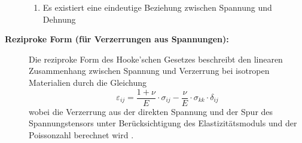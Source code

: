 \begin{description}
\begin{enumerate}
	 	\item Es existiert eine eindeutige Beziehung zwischen Spannung und Dehnung
	 \end{enumerate}
	 \item[\textbf{Reziproke Form (für Verzerrungen aus Spannungen):}] Die reziproke Form des Hooke’schen Gesetzes beschreibt den linearen Zusammenhang zwischen Spannung und Verzerrung bei isotropen Materialien durch die Gleichung
	 \begin{equation}
	 	\varepsilon_{ij} = 
	 	\frac{1+\nu}{E} \cdot \sigma_{ij} - \frac{\nu}{E} \cdot \sigma_{kk} \cdot \delta_{ij}
	 \end{equation}
	 wobei die Verzerrung aus der direkten Spannung und der Spur des Spannungstensors unter Berücksichtigung des Elastizitätsmoduls und der Poissonzahl berechnet wird \cite{elastomechanik:Grundlagen_der_Elastizitaetstheorie}.
\end{description}
